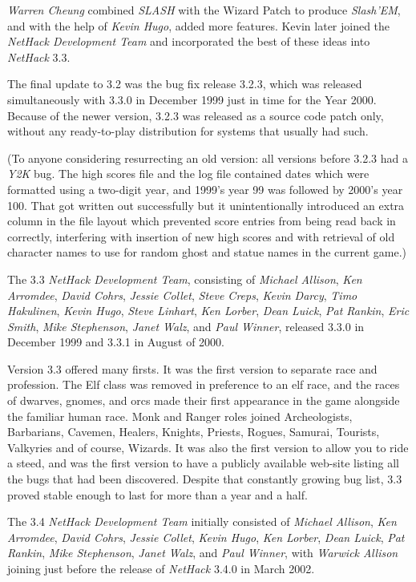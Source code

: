 \medskip
{\it Warren Cheung} combined {\it SLASH} with the Wizard Patch
to produce {\it Slash'EM\/}, and
with the help of {\it Kevin Hugo}, added more features.
Kevin later joined the {\it NetHack Development Team} and incorporated
the best of these ideas into {\it NetHack\/} 3.3.

\medskip
The final update to 3.2 was the bug fix release 3.2.3, which was released
simultaneously with 3.3.0 in December 1999 just in time for the Year 2000.
Because of the newer version, 3.2.3 was released as a source code patch only,
without any ready-to-play distribution for systems that usually had such.

(To anyone considering resurrecting an old version:  all versions before
3.2.3 had a {\it Y2K\/} bug.
The high scores file and the log file contained
dates which were formatted using a two-digit year, and 1999's year 99 was
followed by 2000's year 100.
That got written out successfully but it
unintentionally introduced an extra column in the file layout which prevented
score entries from being read back in correctly, interfering with insertion
of new high scores and with retrieval of old character names to use for
random ghost and statue names in the current game.)

\medskip
The 3.3 {\it NetHack Development Team}, consisting of {\it Michael Allison}, {\it Ken Arromdee},
{\it David Cohrs}, {\it Jessie Collet}, {\it Steve Creps}, {\it Kevin Darcy},
{\it Timo Hakulinen}, {\it Kevin Hugo}, {\it Steve Linhart}, {\it Ken Lorber},
{\it Dean Luick}, {\it Pat Rankin}, {\it Eric Smith}, {\it Mike Stephenson},
{\it Janet Walz}, and {\it Paul Winner}, released 3.3.0 in
December 1999 and 3.3.1 in August of 2000.

\medskip
Version 3.3 offered many firsts. It was the first version to separate race
and profession. The Elf class was removed in preference to an elf race,
and the races of dwarves, gnomes, and orcs made their first appearance in
the game alongside the familiar human race.  Monk and Ranger roles joined
Archeologists, Barbarians, Cavemen, Healers, Knights, Priests, Rogues, Samurai,
Tourists, Valkyries and of course, Wizards.  It was also the first version
to allow you to ride a steed, and was the first version to have a publicly
available web-site listing all the bugs that had been discovered.  Despite
that constantly growing bug list, 3.3 proved stable enough to last for
more than a year and a half.

\medskip
The 3.4 {\it NetHack Development Team} initially consisted of
{\it Michael Allison}, {\it Ken Arromdee},
{\it David Cohrs}, {\it Jessie Collet}, {\it Kevin Hugo}, {\it Ken Lorber},
{\it Dean Luick}, {\it Pat Rankin}, {\it Mike Stephenson},
{\it Janet Walz}, and {\it Paul Winner}, with {\it  Warwick Allison} joining
just before the release of {\it NetHack\/} 3.4.0 in March 2002.

